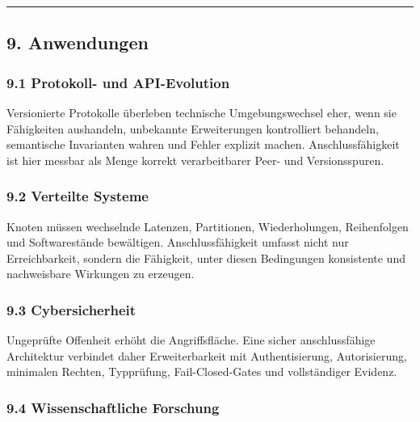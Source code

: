 \documentclass[
  10pt,
  a4paper,
]{article}
\begin{document}
\begin{center}\rule{0.5\linewidth}{0.5pt}\end{center}

\hypertarget{anwendungen}{%
\subsection{9. Anwendungen}\label{anwendungen}}

\hypertarget{protokoll--und-api-evolution}{%
\subsubsection{9.1 Protokoll- und
API-Evolution}\label{protokoll--und-api-evolution}}

Versionierte Protokolle überleben technische Umgebungswechsel eher, wenn
sie Fähigkeiten aushandeln, unbekannte Erweiterungen kontrolliert
behandeln, semantische Invarianten wahren und Fehler explizit machen.
Anschlussfähigkeit ist hier messbar als Menge korrekt verarbeitbarer
Peer- und Versionsspuren.

\hypertarget{verteilte-systeme}{%
\subsubsection{9.2 Verteilte Systeme}\label{verteilte-systeme}}

Knoten müssen wechselnde Latenzen, Partitionen, Wiederholungen,
Reihenfolgen und Softwarestände bewältigen. Anschlussfähigkeit umfasst
nicht nur Erreichbarkeit, sondern die Fähigkeit, unter diesen
Bedingungen konsistente und nachweisbare Wirkungen zu erzeugen.

\hypertarget{cybersicherheit}{%
\subsubsection{9.3 Cybersicherheit}\label{cybersicherheit}}

Ungeprüfte Offenheit erhöht die Angriffsfläche. Eine sicher
anschlussfähige Architektur verbindet daher Erweiterbarkeit mit
Authentisierung, Autorisierung, minimalen Rechten, Typprüfung,
Fail-Closed-Gates und vollständiger Evidenz.

\hypertarget{wissenschaftliche-forschung}{%
\subsubsection{9.4 Wissenschaftliche
Forschung}\label{wissenschaftliche-forschung}}
\end{document}
